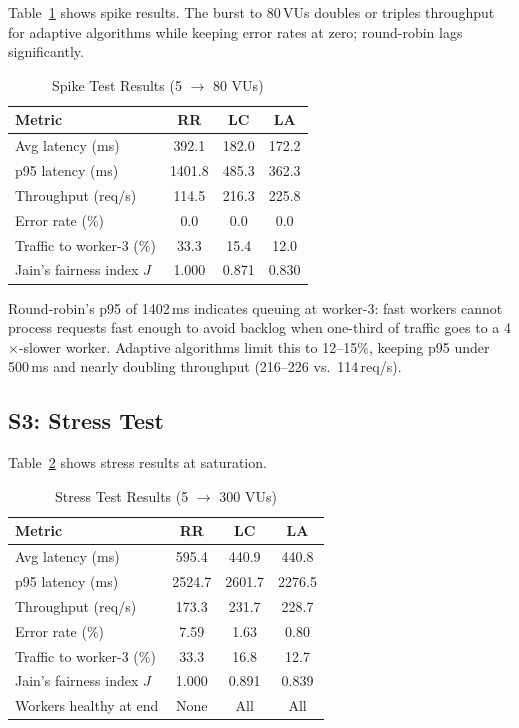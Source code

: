 \documentclass[conference]{IEEEtran}
\begin{document}
Table~\ref{tab:spike} shows spike results. The burst to 80\,VUs
doubles or triples throughput for adaptive algorithms while keeping
error rates at zero; round-robin lags significantly.

\begin{table}[h]
\caption{Spike Test Results (5 $\rightarrow$ 80 VUs)}
\label{tab:spike}
\centering
\begin{tabular}{@{}lccc@{}}
\toprule
Metric & RR & LC & LA \\
\midrule
Avg latency (ms)          & 392.1  & 182.0 & 172.2 \\
p95 latency (ms)          & 1401.8 & 485.3 & 362.3 \\
Throughput (req/s)        & 114.5  & 216.3 & 225.8 \\
Error rate (\%)           & 0.0    & 0.0   & 0.0   \\
Traffic to worker-3 (\%) & 33.3   & 15.4  & 12.0  \\
Jain's fairness index $J$ & 1.000 & 0.871 & 0.830 \\
\bottomrule
\end{tabular}
\end{table}

Round-robin's p95 of 1402\,ms indicates queuing at worker-3: fast
workers cannot process requests fast enough to avoid backlog when
one-third of traffic goes to a 4$\times$-slower worker. Adaptive
algorithms limit this to 12--15\%, keeping p95 under 500\,ms and
nearly doubling throughput (216--226 vs.\ 114\,req/s).

\subsection{S3: Stress Test}

Table~\ref{tab:stress} shows stress results at saturation.

\begin{table}[h]
\caption{Stress Test Results (5 $\rightarrow$ 300 VUs)}
\label{tab:stress}
\centering
\begin{tabular}{@{}lccc@{}}
\toprule
Metric & RR & LC & LA \\
\midrule
Avg latency (ms)          & 595.4  & 440.9  & 440.8  \\
p95 latency (ms)          & 2524.7 & 2601.7 & 2276.5 \\
Throughput (req/s)        & 173.3  & 231.7  & 228.7  \\
Error rate (\%)           & 7.59   & 1.63   & 0.80   \\
Traffic to worker-3 (\%) & 33.3   & 16.8   & 12.7   \\
Jain's fairness index $J$ & 1.000 & 0.891 & 0.839 \\
Workers healthy at end    & None   & All    & All    \\
\bottomrule
\end{tabular}
\end{table}
\end{document}

